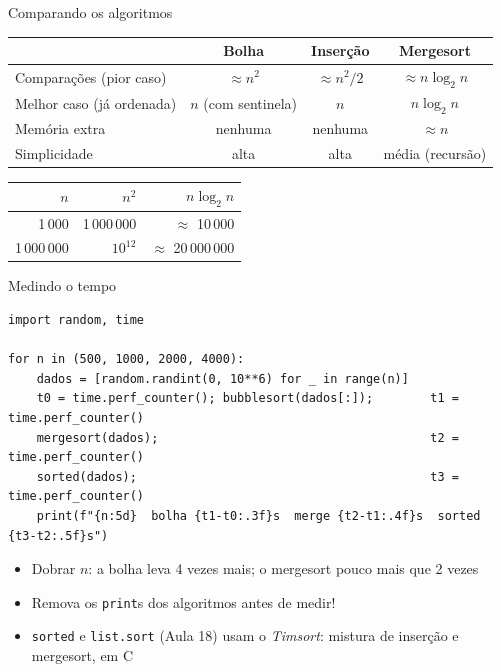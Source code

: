 \documentclass[aspectratio=169,10pt,t]{beamer}
\begin{document}
\begin{frame}{Comparando os algoritmos}
  \centering\small
  \begin{tabular}{lccc}
    \toprule
    & \textbf{Bolha} & \textbf{Inserção} & \textbf{Mergesort}\\
    \midrule
    Comparações (pior caso) & \(\approx n^2\) & \(\approx n^2/2\) & \(\approx n\log_2 n\)\\
    Melhor caso (já ordenada) & \(n\) (com sentinela) & \(n\) & \(n\log_2 n\)\\
    Memória extra & nenhuma & nenhuma & \(\approx n\)\\
    Simplicidade & alta & alta & média (recursão)\\
    \bottomrule
  \end{tabular}
  \vspace{2ex}

  \normalsize
  \begin{tabular}{rrr}
    \toprule
    \(n\) & \(n^2\) & \(n\log_2 n\)\\
    \midrule
    1\,000 & 1\,000\,000 & \(\approx\) 10\,000\\
    1\,000\,000 & \(10^{12}\) & \(\approx\) 20\,000\,000\\
    \bottomrule
  \end{tabular}
\end{frame}

\begin{frame}[fragile]{Medindo o tempo}
\begin{lstlisting}
import random, time

for n in (500, 1000, 2000, 4000):
    dados = [random.randint(0, 10**6) for _ in range(n)]
    t0 = time.perf_counter(); bubblesort(dados[:]);        t1 = time.perf_counter()
    mergesort(dados);                                      t2 = time.perf_counter()
    sorted(dados);                                         t3 = time.perf_counter()
    print(f"{n:5d}  bolha {t1-t0:.3f}s  merge {t2-t1:.4f}s  sorted {t3-t2:.5f}s")
\end{lstlisting}
  \begin{itemize}
    \item Dobrar \(n\): a bolha leva \alert{4 vezes} mais; o mergesort pouco mais que 2 vezes
    \item Remova os \texttt{print}s dos algoritmos antes de medir!
    \item \texttt{sorted} e \texttt{list.sort} (Aula 18) usam o \emph{Timsort}: mistura de inserção e mergesort, em C
  \end{itemize}
\end{frame}
\end{document}
